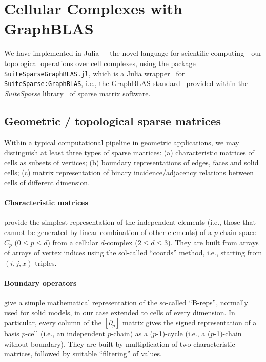 \section{Cellular Complexes with GraphBLAS }\label{graphblas-implementation}

We have implemented in Julia~\cite{BEKS14}---the novel language for scientific computing---our topological operations over cell complexes, using the package \href{https://github.com/abhinavmehndiratta/GraphBLAS.jl}{\texttt{SuiteSparseGraphBLAS.jl}}, which is a Julia wrapper~\cite{Mehndiratta:2019} for \texttt{SuiteSparse:GraphBLAS}, i.e., the GraphBLAS standard~\cite{osti_1208646,DBLP:journals/corr/KepnerABBFGHKLM16,Buluc:7965104} provided within the \emph{SuiteSparse} library~\cite{Davis:2018}  of sparse matrix software. 


\subsection{Geometric / topological sparse matrices}

Within a typical computational pipeline in geometric applications, we may distinguish at least three types of sparse matrices: (a) characteristic matrices of cells as subsets of vertices; (b) boundary representations of edges, faces and solid cells; (c) matrix representation of binary incidence/adjacency relations between cells of different dimension. 

\paragraph{Characteristic matrices} provide the simplest representation of the independent elements (i.e., those that cannot be generated by linear combination of other elements) of a $p$-chain space $C_p$ ($0\leq p \leq d$) from a cellular $d$-complex ($2\leq d \leq 3$). They are built from arrays of arrays of vertex indices using the sol-called ``coords'' method, i.e., starting from $(i,j,x)$ triples.

\paragraph{Boundary operators} give a simple mathematical representation of the so-called ``B-reps'', normally used for solid models, in our case extended to cells of every dimension. In particular, every column of the $[\partial_p]$ matrix gives the signed representation of a basis $p$-cell (i.e., an independent $p$-chain) as a ($p$-1)-cycle (i.e., a ($p$-1)-chain without-boundary). They are built by multiplication of two characteristic matrices, followed by suitable ``filtering'' of  values.

